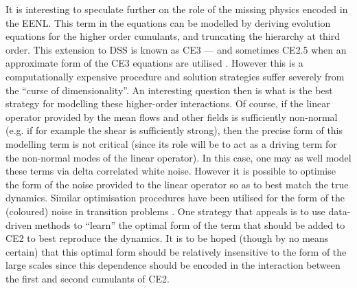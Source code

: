 \documentclass{jfm}
\begin{document}
It is interesting to speculate further on the role of the missing physics encoded in the EENL. This term in the equations can be modelled by deriving evolution equations for the higher order cumulants, and truncating the hierarchy at third order. This extension to DSS is known as CE3 --- and sometimes CE2.5 when an approximate form of the CE3 equations are utilised \citep{marston_qi_tobias_2019}. However this is a computationally expensive procedure and solution strategies suffer severely from the ``curse of dimensionality''. An interesting question then is what is the best strategy for modelling these higher-order interactions. Of course, if the linear operator provided by the mean flows and other fields is sufficiently non-normal (e.g. if for example the shear is sufficiently strong), then the precise form of this modelling term is not critical (since its role will be to act as a driving term for the non-normal modes of the linear operator). In this case, one may as well model these terms via delta correlated white noise. However it is possible to optimise the form of the noise provided to the linear operator so as to best match the true dynamics. Similar optimisation procedures have been utilised for the form of the (coloured) noise in transition problems \citep[][]{zjg_2017}. One strategy that appeals is to use data-driven methods to ``learn'' the optimal form of the term that should be added to CE2 to best reproduce the dynamics. It is to be hoped (though by no means certain) that this optimal form should be relatively insensitive to the form of the large scales since this dependence should be encoded in the interaction between the first and second cumulants of CE2.   




\end{document}
